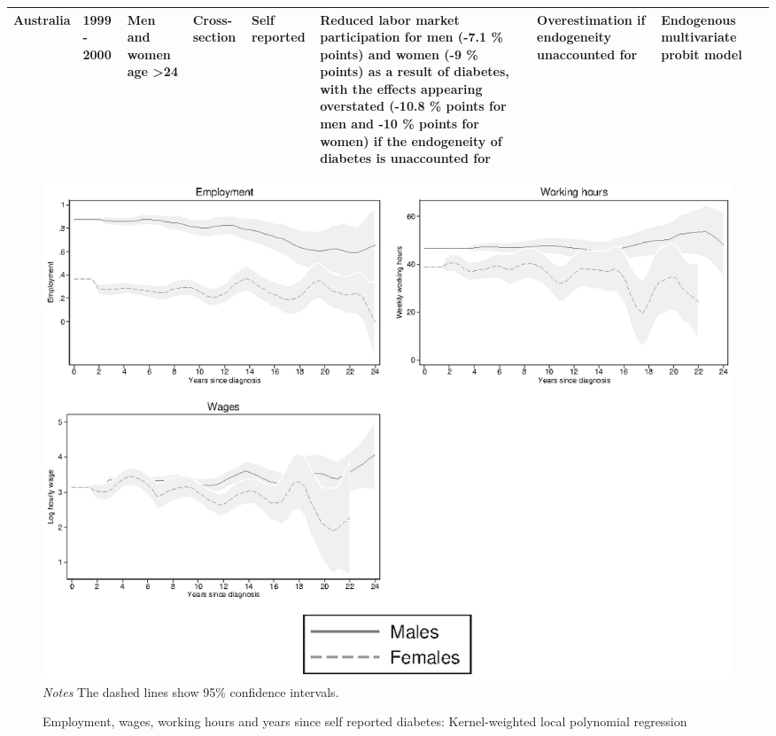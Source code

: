\documentclass[12pt,english]{article}
\begin{document}
{\begin{landscape}
\begin{tabularx}{\linewidth}{m m m m b b b b m}
			Australia & 1999 - 2000  & Men and women age \textgreater 24                                & Cross-section           & Self reported                                & Reduced labor market participation for men (-7.1 \% points) and women (-9 \% points) as a result of diabetes, with the effects appearing overstated (-10.8 \% points for men and -10 \% points for women) if the endogeneity of diabetes is unaccounted for                                                                                                                                                                                                                                                                                                                                                                                    & Overestimation if endogeneity unaccounted for                                           & Endogenous multivariate probit model                                                                                                                                                                                                                                                                 & \textcite{Zhang2009} \\ \bottomrule
		\end{tabularx}
	\end{landscape}
}

\begin{figure}[h!]
	\caption{\label{fig:Kernel-weighted-local-polynomial_comb}Employment, wages, working hours and years since self reported diabetes:  Kernel-weighted local polynomial regression}%
	\begin{center}
		\includegraphics[width=\linewidth]{figures/lpoly_combined.eps}\\
		\footnotesize{\textit{Notes} The dashed lines show 95\% confidence intervals.}
	\end{center}
\end{figure}
\end{document}
